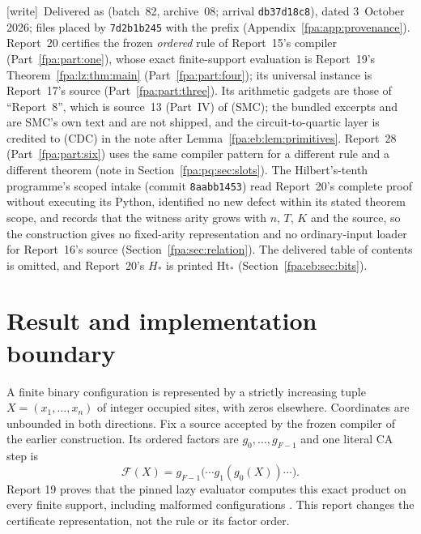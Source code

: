 \documentclass[11pt,a4paper]{article}
\numberwithin{equation}{section}
\newcommand{\CA}{\mathcal F}\newcommand{\tabsize}{S_{\rm tab}}\newcommand{\Dv}{D_{\rm v}}
\newcommand{\wtag}{\textup{[write]}}
\begin{document}
\wtag\ Delivered as  (batch~82, archive~08; arrival \texttt{db37d18c8}), dated 3~October 2026; files placed by \texttt{7d2b1b245} with the prefix  (Appendix~\ref{fpa:app:provenance}). Report~20 certifies the frozen \emph{ordered} rule of Report~15's compiler (Part~\ref{fpa:part:one}), whose exact finite-support evaluation is Report~19's Theorem~\ref{fpa:lz:thm:main} (Part~\ref{fpa:part:four}); its universal instance is Report~17's source (Part~\ref{fpa:part:three}). Its arithmetic gadgets are those of ``Report~8'', which is source~13 (Part~IV) of  (SMC); the bundled excerpts  and  are SMC's own text and are not shipped, and the circuit-to-quartic layer is credited to  (CDC) in the note after Lemma~\ref{fpa:eb:lem:primitives}. Report~28 (Part~\ref{fpa:part:six}) uses the same compiler pattern for a different rule and a different theorem (note in Section~\ref{fpa:pq:sec:slots}). The Hilbert's-tenth programme's scoped intake  (commit \texttt{8aabb1453}) read Report~20's complete proof without executing its Python, identified no new defect within its stated theorem scope, and records that the witness arity grows with $n$, $T$, $K$ and the source, so the construction gives no fixed-arity representation and no ordinary-input loader for Report~16's source (Section~\ref{fpa:sec:relation}). The delivered table of contents is omitted, and Report~20's $H_*$ is printed $\mathrm{Ht}_*$ (Section~\ref{fpa:eb:sec:bits}).

\section{Result and implementation boundary}\label{fpa:rep:20:first}
A finite binary configuration is represented by a strictly increasing tuple $X=(x_1,\ldots,x_n)$ of integer occupied sites, with zeros elsewhere. Coordinates are unbounded in both directions. Fix a source accepted by the frozen compiler of the earlier construction. Its ordered factors are $g_0,\ldots,g_{F-1}$ and one literal CA step is
\[
\CA(X)=g_{F-1}\bigl(\cdots g_1(g_0(X))\cdots\bigr).
\]
Report 19 proves that the pinned lazy evaluator computes this exact product on every finite support, including malformed configurations \cite{fpa:r19}. This report changes the certificate representation, not the rule or its factor order.
\end{document}
